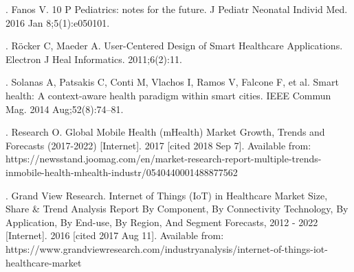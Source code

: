 \documentclass[letterpaper,12pt]{article}
\begin{document}
\begin{thebibliography}{299}
. Fanos V. 10 P Pediatrics: notes for the future. J Pediatr Neonatal Individ Med. 2016 Jan 8;5(1):e050101.

. Röcker C, Maeder A. User-Centered Design of Smart Healthcare Applications. Electron J Heal Informatics.
2011;6(2):11.

. Solanas A, Patsakis C, Conti M, Vlachos I, Ramos V, Falcone F, et al. Smart health: A context-aware health paradigm
within smart cities. IEEE Commun Mag. 2014 Aug;52(8):74–81.

. Research O. Global Mobile Health (mHealth) Market Growth, Trends and Forecasts (2017-2022) [Internet]. 2017
[cited 2018 Sep 7]. Available from: https://newsstand.joomag.com/en/market-research-report-multiple-trends-inmobile-health-mhealth-industr/0540440001488877562

. Grand View Research. Internet of Things (IoT) in Healthcare Market Size, Share & Trend Analysis Report By
Component, By Connectivity Technology, By Application, By End-use, By Region, And Segment Forecasts, 2012 -
2022 [Internet]. 2016 [cited 2017 Aug 11]. Available from: https://www.grandviewresearch.com/industryanalysis/internet-of-things-iot-healthcare-market

\end{thebibliography}
\end{document}
